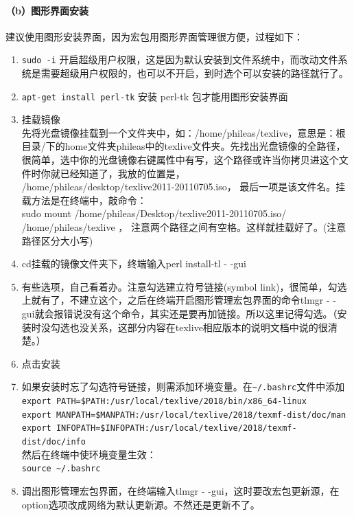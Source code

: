 \paragraph{（b）图形界面安装}
建议使用图形安装界面，因为宏包用图形界面管理很方便，过程如下：
\begin{enumerate}
\item \verb*|sudo -i| 开启超级用户权限，这是因为默认安装到文件系统中，而改动文件系统是需要超级用户权限的，也可以不开启，到时选个可以安装的路径就行了。
\item  \verb*|apt-get install perl-tk| 安装 perl-tk 包才能用图形安装界面
\item 挂载镜像\\
先将光盘镜像挂载到一个文件夹中，如：/home/phileas/texlive，意思是：根目录/下的home文件夹phileas中的texlive文件夹。先找出光盘镜像的全路径，很简单，选中你的光盘镜像右键属性中有写，这个路径或许当你拷贝进这个文件时你就已经知道了，我放的位置是，\\
/home/phileas/desktop/texlive2011-20110705.iso，
最后一项是该文件名。挂载方法是在终端中，敲命令：\\
sudo mount /home/phileas/Desktop/texlive2011-20110705.iso/~~ /home/phileas/texlive ，
注意两个路径之间有空格。这样就挂载好了。(注意路径区分大小写)
\item cd挂载的镜像文件夹下，终端输入perl install-tl  - -gui
\item 有些选项，自己看着办。注意勾选建立符号链接(symbol link)，很简单，勾选上就有了，不建立这个，之后在终端开启图形管理宏包界面的命令tlmgr - - gui就会报错说没有这个命令，其实还是要再加链接。所以这里记得勾选。（安装时没勾选也没关系，这部分内容在texlive相应版本的说明文档中说的很清楚。）
\item 点击安装

\item 如果安装时忘了勾选符号链接，则需添加环境变量。在\verb|~/.bashrc|文件中添加\\
\verb|export PATH=$PATH:/usr/local/texlive/2018/bin/x86_64-linux|\\
\verb|export MANPATH=$MANPATH:/usr/local/texlive/2018/texmf-dist/doc/man|\\
\verb|export INFOPATH=$INFOPATH:/usr/local/texlive/2018/texmf-dist/doc/info|\\
然后在终端中使环境变量生效：\\
\verb|source ~/.bashrc|

\item 调出图形管理宏包界面，在终端输入tlmgr - -gui，这时要改宏包更新源，在option选项改成网络为默认更新源。不然还是更新不了。
\end{enumerate}


